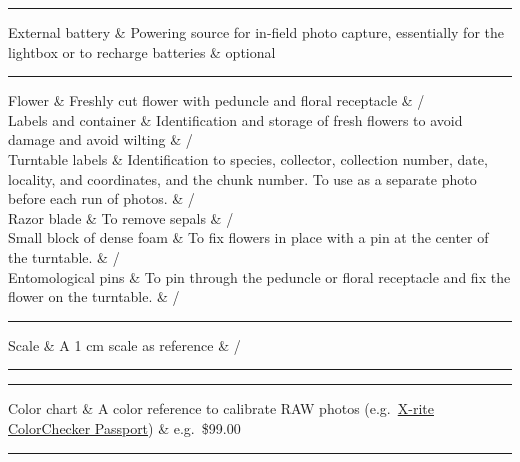\documentclass[
]{book}
\theoremstyle{definition}
\theoremstyle{definition}
\theoremstyle{definition}
\theoremstyle{definition}
\theoremstyle{remark}
\begin{document}
\begin{center}\rule{0.5\linewidth}{0.5pt}\end{center}

External battery \& Powering source for in-field photo capture,
essentially for the lightbox or to recharge batteries \& optional\\

\begin{center}\rule{0.5\linewidth}{0.5pt}\end{center}

\hfill\break
Flower \& Freshly cut flower with peduncle and floral receptacle \& /\\
Labels and container \& Identification and storage of fresh flowers to
avoid damage and avoid wilting \& /\\
Turntable labels \& Identification to species, collector, collection
number, date, locality, and coordinates, and the chunk number. To use as
a separate photo before each run of photos. \& /\\
Razor blade \& To remove sepals \& /\\
Small block of dense foam \& To fix flowers in place with a pin at the
center of the turntable. \& /\\
Entomological pins \& To pin through the peduncle or floral receptacle
and fix the flower on the turntable. \& /\\

\begin{center}\rule{0.5\linewidth}{0.5pt}\end{center}

Scale \& A 1 cm scale as reference \& /\\

\begin{center}\rule{0.5\linewidth}{0.5pt}\end{center}

\hfill\break

\begin{center}\rule{0.5\linewidth}{0.5pt}\end{center}

Color chart \& A color reference to calibrate RAW photos (e.g.~\href{https://www.xrite.com/categories/calibration-profiling/colorchecker-targets/colorchecker-passport-photo-2}{X-rite
ColorChecker
Passport})
\& e.g.~\$99.00\\

\begin{center}\rule{0.5\linewidth}{0.5pt}\end{center}
\end{document}
